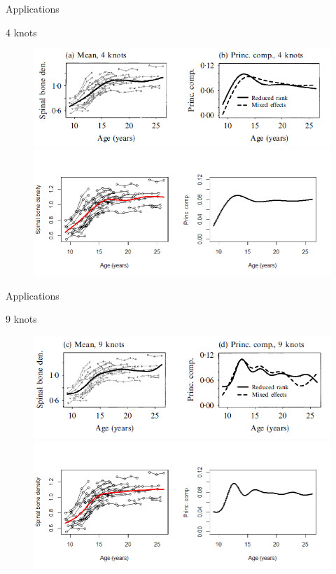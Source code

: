 \documentclass{beamer}
\begin{document}
\begin{frame}{Applications}
	\begin{block}{4 knots}
		\begin{figure}[h] %
			\begin{center}
				\includegraphics[width=0.8\linewidth]{img/4knots_true.png}
				\includegraphics[width=0.8\linewidth]{img/4knots.png}
			\end{center}
			\label{fig:long}
			\label{fig:onecol}
		\end{figure}
	\end{block}
\end{frame}

\begin{frame}{Applications}
	\begin{block}{9 knots}
		\begin{figure}[h] %
			\begin{center}
				\includegraphics[width=0.8\linewidth]{img/9knots_true.png}
				\includegraphics[width=0.8\linewidth]{img/9knots.png}
			\end{center}
			\label{fig:long}
			\label{fig:onecol}
		\end{figure}
	\end{block}
\end{frame}
\end{document}
